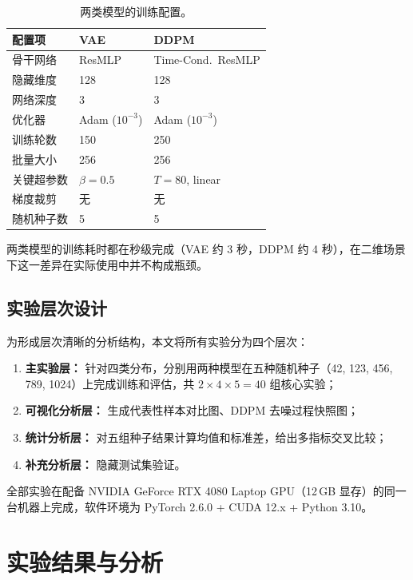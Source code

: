 \documentclass[UTF8,a4paper,12pt]{ctexart}
\begin{document}
\begin{table}[H]
\centering
\small
\caption{两类模型的训练配置。}
\label{tab:training-config}
\begin{tabular}{p{2.6cm}p{4.5cm}p{4.5cm}}
\toprule
配置项 & VAE & DDPM \\
\midrule
骨干网络 & ResMLP & Time-Cond.\ ResMLP \\
隐藏维度 & 128 & 128 \\
网络深度 & 3 & 3 \\
优化器 & Adam ($10^{-3}$) & Adam ($10^{-3}$) \\
训练轮数 & 150 & 250 \\
批量大小 & 256 & 256 \\
关键超参数 & $\beta{=}0.5$ & $T{=}80$, linear \\
梯度裁剪 & 无 & 无 \\
随机种子数 & 5 & 5 \\
\bottomrule
\end{tabular}
\end{table}

两类模型的训练耗时都在秒级完成（VAE 约 3 秒，DDPM 约 4 秒），在二维场景下这一差异在实际使用中并不构成瓶颈。

\subsection{实验层次设计}

为形成层次清晰的分析结构，本文将所有实验分为四个层次：

\begin{enumerate}
    \item \textbf{主实验层：} 针对四类分布，分别用两种模型在五种随机种子（42, 123, 456, 789, 1024）上完成训练和评估，共 $2\times4\times5=40$ 组核心实验；
    \item \textbf{可视化分析层：} 生成代表性样本对比图、DDPM 去噪过程快照图；
    \item \textbf{统计分析层：} 对五组种子结果计算均值和标准差，给出多指标交叉比较；
    \item \textbf{补充分析层：} 隐藏测试集验证。
\end{enumerate}

全部实验在配备 NVIDIA GeForce RTX 4080 Laptop GPU（12\,GB 显存）的同一台机器上完成，软件环境为 PyTorch 2.6.0 + CUDA 12.x + Python 3.10。

\section{实验结果与分析}
\end{document}
